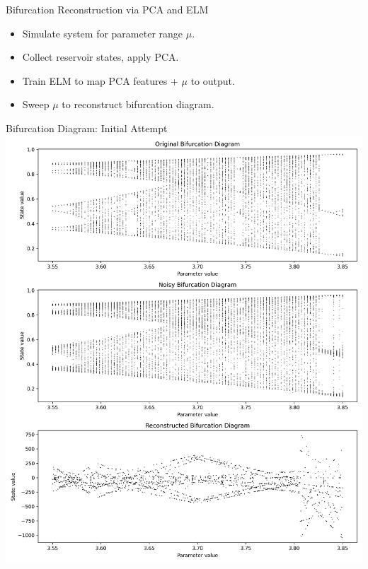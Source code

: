 \documentclass{beamer}
\begin{document}
\begin{frame}{Bifurcation Reconstruction via PCA and ELM}
  \begin{itemize}
    \item Simulate system for parameter range $\mu$.
    \item Collect reservoir states, apply PCA.
    \item Train ELM to map PCA features + $\mu$ to output.
    \item Sweep $\mu$ to reconstruct bifurcation diagram.
  \end{itemize}
\end{frame}

\begin{frame}{Bifurcation Diagram: Initial Attempt}
  \includegraphics[width=1\linewidth]{figures/bd_reconstruction_elm.png}
\end{frame}
\end{document}
